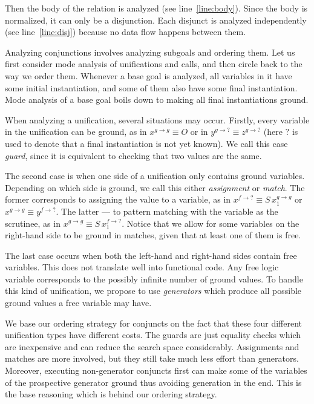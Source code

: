 Then the body of the relation is analyzed (see line~\ref{line:body}).
Since the body is normalized, it can only be a disjunction.
Each disjunct is analyzed independently (see line~\ref{line:disj}) because no data flow happens between them.

Analyzing conjunctions involves analyzing subgoals and ordering them.
Let us first consider mode analysis of unifications and calls, and then circle back to the way we order them.
Whenever a base goal is analyzed, all variables in it have some initial instantiation, and some of them also have some final instantiation.
Mode analysis of a base goal boils down to making all final instantiations ground.

When analyzing a unification, several situations may occur.
Firstly, every variable in the unification can be ground, as in $x^{g \rightarrow g} \equiv O$ or in $y^{g \rightarrow ?} \equiv z^{g \rightarrow ?}$ (here $?$ is used to denote that a final instantiation is not yet known).
We call this case \emph{guard}, since it is equivalent to checking that two values are the same.

The second case is when one side of a unification only contains ground variables.
Depending on which side is ground, we call this either \emph{assignment} or \emph{match}.
The former corresponds to assigning the value to a variable, as in $x^{f \rightarrow ?} \equiv S \, x_1^{g \rightarrow g}$ or $x^{g \rightarrow g} \equiv y^{f \rightarrow ?}$.
The latter --- to pattern matching with the variable as the scrutinee, as in $x^{g \rightarrow g} \equiv S \, x_1^{f \rightarrow ?}$.
Notice that we allow for some variables on the right-hand side to be ground in matches, given that at least one of them is free.

The last case occurs when both the left-hand and right-hand sides contain free variables.
This does not translate well into functional code.
Any free logic variable corresponds to the possibly infinite number of ground values.
To handle this kind of unification, we propose to use \emph{generators} which produce all possible ground values a free variable may have.

We base our ordering strategy for conjuncts on the fact that these four different unification types have different costs.
The guards are just equality checks which are inexpensive and can reduce the search space considerably.
Assignments and matches are more involved, but they still take much less effort than generators.
Moreover, executing non-generator conjuncts first can make some of the variables of the prospective generator ground thus avoiding generation in the end.
This is the base reasoning which is behind our ordering strategy.

